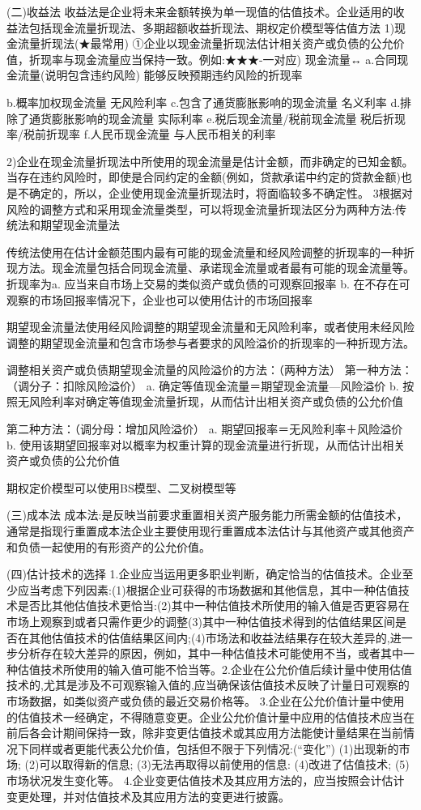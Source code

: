 \documentclass[UTF8,12pt]{ctexart}
\numberwithin{equation}{section} %
\numberwithin{figure}{section}
\numberwithin{table}{section}
\begin{document}
	(二)收益法
	收益法是企业将未来金额转换为单一现值的估值技术。企业适用的收益法包括现金流量折现法、多期超额收益折现法、期权定价模型等估值方法
	1)现金流量折现法(★最常用)
	①企业以现金流量折现法估计相关资产或负债的公允价值，折现率与现金流量应当保持一致。例如:★★★-一对应)
	现金流量↔
	a.合同现金流量(说明包含违约风险) 能够反映预期违约风险的折现率
	
	b.概率加权现金流量 无风险利率
	c.包含了通货膨胀影响的现金流量 名义利率
	d.排除了通货膨胀影响的现金流量 实际利率
	e.税后现金流量/税前现金流量 税后折现率/税前折现率
	f.人民币现金流量 与人民币相关的利率
	
	2)企业在现金流量折现法中所使用的现金流量是估计金额，而非确定的已知金额。
	当存在违约风险时，即使是合同约定的金额(例如，贷款承诺中约定的贷款金额)也是不确定的，所以，企业使用现金流量折现法时，将面临较多不确定性。
	3根据对风险的调整方式和采用现金流量类型，可以将现金流量折现法区分为两种方法:传统法和期望现金流量法
	
	传统法使用在估计金额范围内最有可能的现金流量和经风险调整的折现率的一种折现方法。现金流量包括合同现金流量、承诺现金流量或者最有可能的现金流量等。折现率为a.	应当来自市场上交易的类似资产或负债的可观察回报率
	b.	在不存在可观察的市场回报率情况下，企业也可以使用估计的市场回报率
	
	期望现金流量法使用经风险调整的期望现金流量和无风险利率，或者使用未经风险调整的期望现金流量和包含市场参与者要求的风险溢价的折现率的一种折现方法。
	
	调整相关资产或负债期望现金流量的风险溢价的方法：（两种方法）
	第一种方法：（调分子：扣除风险溢价）
	a.	确定等值现金流量＝期望现金流量—风险溢价
	b.	按照无风险利率对确定等值现金流量折现，从而估计出相关资产或负债的公允价值
	
	第二种方法：（调分母：增加风险溢价）
	a.	期望回报率＝无风险利率＋风险溢价
	b.	使用该期望回报率对以概率为权重计算的现金流量进行折现，从而估计出相关资产或负债的公允价值
	
	期权定价模型可以使用BS模型、二叉树模型等
	
	(三)成本法
	成本法:是反映当前要求重置相关资产服务能力所需金额的估值技术，通常是指现行重置成本法企业主要使用现行重置成本法估计与其他资产或其他资产和负债一起使用的有形资产的公允价值。
	
	(四)估计技术的选择
	1.企业应当运用更多职业判断，确定恰当的估值技术。企业至少应当考虑下列因素:(1)根据企业可获得的市场数据和其他信息，其中一种估值技术是否比其他估值技术更恰当:(2)其中一种估值技术所使用的输入值是否更容易在市场上观察到或者只需作更少的调整(3)其中一种估值技术得到的估值结果区间是否在其他估值技术的估值结果区间内;(4)市场法和收益法结果存在较大差异的,进一步分析存在较大差异的原因，例如，其中一种估值技术可能使用不当，或者其中一种估值技术所使用的输入值可能不恰当等。2.企业在公允价值后续计量中使用估值技术的,尤其是涉及不可观察输入值的,应当确保该估值技术反映了计量日可观察的市场数据，如类似资产或负债的最近交易价格等。
	3.企业在公允价值计量中使用的估值技术一经确定，不得随意变更。企业公允价值计量中应用的估值技术应当在前后各会计期间保持一致，除非变更估值技术或其应用方法能使计量结果在当前情况下同样或者更能代表公允价值，包括但不限于下列情况:(“变化”)
	(1)出现新的市场;
	(2)可以取得新的信息;
	(3)无法再取得以前使用的信息:
	(4)改进了估值技术;
	(5)市场状况发生变化等。
	4.企业变更估值技术及其应用方法的，应当按照会计估计变更处理，并对估值技术及其应用方法的变更进行披露。
	
\end{document}

